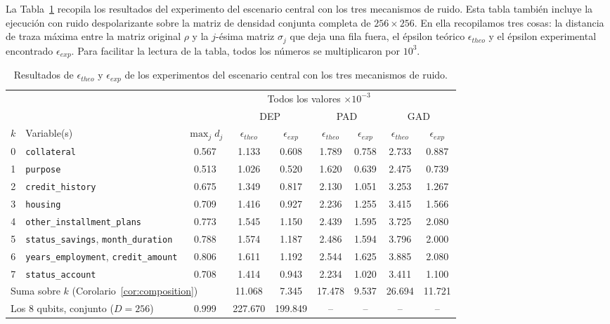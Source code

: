 \documentclass{ieeeaccess}
\begin{document}
La Tabla~\ref{tab:central_results} recopila los resultados del experimento del escenario central con los tres mecanismos de ruido. Esta tabla también incluye la ejecución con ruido despolarizante sobre la matriz de densidad conjunta completa de $256 \times 256$. En ella recopilamos tres cosas: la distancia de traza máxima entre la matriz original $\rho$ y la $j$-ésima matriz $\sigma_j$ que deja una fila fuera, el épsilon teórico $\epsilon_{theo}$ y el épsilon experimental encontrado $\epsilon_{exp}$. Para facilitar la lectura de la tabla, todos los números se multiplicaron por $10^{3}$.

\begin{table}[!t]
  \caption{Resultados de $\epsilon_{theo}$ y $\epsilon_{exp}$ de los experimentos del escenario central con los tres mecanismos de ruido.}
  \label{tab:central_results}
  \centering
  \begin{tabular}{clccccccc}
    \toprule
     & & \multicolumn{7}{c}{Todos los valores $\times 10^{-3}$} \\
    \cmidrule(l){3-9}
     & & & \multicolumn{2}{c}{DEP} & \multicolumn{2}{c}{PAD} & \multicolumn{2}{c}{GAD} \\
    \cmidrule(lr){4-5} \cmidrule(lr){6-7} \cmidrule(l){8-9}
    $k$ & Variable(s) & $\max_j d_j$ & $\epsilon_{theo}$ & $\epsilon_{exp}$ & $\epsilon_{theo}$ & $\epsilon_{exp}$ & $\epsilon_{theo}$ & $\epsilon_{exp}$ \\
    \midrule
    0 & \texttt{collateral}                                 & 0.567 & 1.133 & 0.608 & 1.789 & 0.758 & 2.733 & 0.887 \\
    1 & \texttt{purpose}                                    & 0.513 & 1.026 & 0.520 & 1.620 & 0.639 & 2.475 & 0.739 \\
    2 & \texttt{credit\_history}                            & 0.675 & 1.349 & 0.817 & 2.130 & 1.051 & 3.253 & 1.267 \\
    3 & \texttt{housing}                                    & 0.709 & 1.416 & 0.927 & 2.236 & 1.255 & 3.415 & 1.566 \\
    4 & \texttt{other\_installment\_plans}                  & 0.773 & 1.545 & 1.150 & 2.439 & 1.595 & 3.725 & 2.080 \\
    5 & \texttt{status\_savings}, \texttt{month\_duration}  & 0.788 & 1.574 & 1.187 & 2.486 & 1.594 & 3.796 & 2.000 \\
    6 & \texttt{years\_employment}, \texttt{credit\_amount} & 0.806 & 1.611 & 1.192 & 2.544 & 1.625 & 3.885 & 2.080 \\
    7 & \texttt{status\_account}                            & 0.708 & 1.414 & 0.943 & 2.234 & 1.020 & 3.411 & 1.100 \\
    \midrule
    \multicolumn{3}{l}{Suma sobre $k$ (Corolario~\ref{cor:composition})} & 11.068 & 7.345 & 17.478 & 9.537 & 26.694 & 11.721 \\
    \midrule
    \multicolumn{2}{l}{Los 8 qubits, conjunto ($D = 256$)} & 0.999 & 227.670 & 199.849 & -- & -- & -- & -- \\
    \bottomrule
  \end{tabular}
\end{table}
\end{document}
